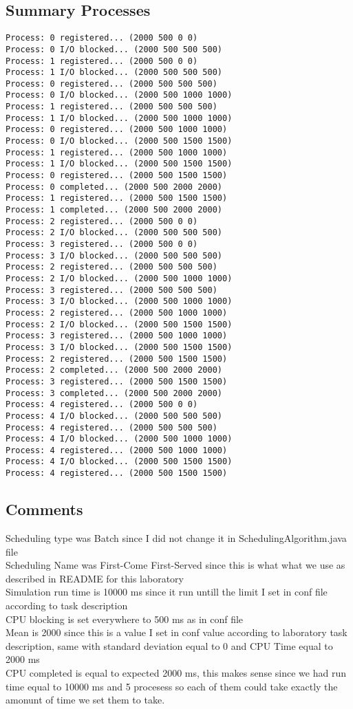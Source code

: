 \documentclass{report}
\begin{document}
\subsection{Summary Processes}
\begin{lstlisting}
Process: 0 registered... (2000 500 0 0)
Process: 0 I/O blocked... (2000 500 500 500)
Process: 1 registered... (2000 500 0 0)
Process: 1 I/O blocked... (2000 500 500 500)
Process: 0 registered... (2000 500 500 500)
Process: 0 I/O blocked... (2000 500 1000 1000)
Process: 1 registered... (2000 500 500 500)
Process: 1 I/O blocked... (2000 500 1000 1000)
Process: 0 registered... (2000 500 1000 1000)
Process: 0 I/O blocked... (2000 500 1500 1500)
Process: 1 registered... (2000 500 1000 1000)
Process: 1 I/O blocked... (2000 500 1500 1500)
Process: 0 registered... (2000 500 1500 1500)
Process: 0 completed... (2000 500 2000 2000)
Process: 1 registered... (2000 500 1500 1500)
Process: 1 completed... (2000 500 2000 2000)
Process: 2 registered... (2000 500 0 0)
Process: 2 I/O blocked... (2000 500 500 500)
Process: 3 registered... (2000 500 0 0)
Process: 3 I/O blocked... (2000 500 500 500)
Process: 2 registered... (2000 500 500 500)
Process: 2 I/O blocked... (2000 500 1000 1000)
Process: 3 registered... (2000 500 500 500)
Process: 3 I/O blocked... (2000 500 1000 1000)
Process: 2 registered... (2000 500 1000 1000)
Process: 2 I/O blocked... (2000 500 1500 1500)
Process: 3 registered... (2000 500 1000 1000)
Process: 3 I/O blocked... (2000 500 1500 1500)
Process: 2 registered... (2000 500 1500 1500)
Process: 2 completed... (2000 500 2000 2000)
Process: 3 registered... (2000 500 1500 1500)
Process: 3 completed... (2000 500 2000 2000)
Process: 4 registered... (2000 500 0 0)
Process: 4 I/O blocked... (2000 500 500 500)
Process: 4 registered... (2000 500 500 500)
Process: 4 I/O blocked... (2000 500 1000 1000)
Process: 4 registered... (2000 500 1000 1000)
Process: 4 I/O blocked... (2000 500 1500 1500)
Process: 4 registered... (2000 500 1500 1500)
\end{lstlisting}    
\subsection{Comments}
Scheduling type was Batch since I did not change it in SchedulingAlgorithm.java
file \\
Scheduling Name was First-Come First-Served since this is what what we use as
described in README for this laboratory \\
Simulation run time is 10000 ms since it run untill the limit I set in conf file
according to task description \\
CPU blocking is set everywhere to 500 ms as in conf file \\
Mean is 2000 since this is a value I set in conf value according to laboratory
task description, same with standard deviation equal to 0 and CPU Time equal to
2000 ms \\
CPU completed is equal to expected 2000 ms, this makes sense since we had run
time equal to 10000 ms and 5 procesess so each of them could take exactly the
amonunt of time we set them to take.
\end{document}
